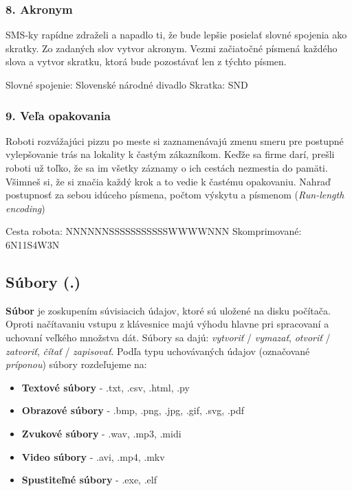 \subsubsection*{8. Akronym}
SMS-ky rapídne zdraželi a napadlo ti, že bude lepšie posielať slovné spojenia ako skratky. Zo zadaných slov vytvor akronym. Vezmi začiatočné písmená každého slova a vytvor skratku, ktorá bude pozostávať len z týchto písmen.

\begin{code}
Slovné spojenie: Slovenské národné divadlo
Skratka: SND
\end{code}


\subsubsection*{9. Veľa opakovania}
Roboti rozvážajúci pizzu po meste si zaznamenávajú zmenu smeru pre postupné vylepšovanie trás na lokality k častým zákazníkom. Keďže sa firme darí, prešli roboti už toľko, že sa im všetky záznamy o ich cestách nezmestia do pamäti. Všimneš si, že si značia každý krok a to vedie k častému opakovaniu. Nahraď postupnosť za sebou idúceho písmena, počtom výskytu a písmenom (\textit{Run-length encoding})

\begin{code}
Cesta robota: NNNNNNSSSSSSSSSSSWWWWNNN
Skomprimované: 6N11S4W3N
\end{code}


\subsection{Súbory (.)}
\textbf{Súbor} je zoskupením súvisiacich údajov, ktoré sú uložené na disku počítača. Oproti načítavaniu vstupu z klávesnice majú výhodu hlavne pri spracovaní a uchovaní veľkého množstva dát. Súbory sa dajú: \textit{vytvoriť} / \textit{vymazať}, \textit{otvoriť} / \textit{zatvoriť}, \textit{čítať} / \textit{zapisovať}. Podľa typu uchovávaných údajov (označované \textit{príponou}) súbory rozdeľujeme na:

\begin{itemize}
\itemsep0pt
\item \textbf{Textové súbory} - .txt, .csv, .html, .py
\item \textbf{Obrazové súbory} - .bmp, .png, .jpg, .gif, .svg, .pdf
\item \textbf{Zvukové súbory} - .wav, .mp3, .midi
\item \textbf{Video súbory} - .avi, .mp4, .mkv
\item \textbf{Spustiteľné súbory} - .exe, .elf
\end{itemize}


